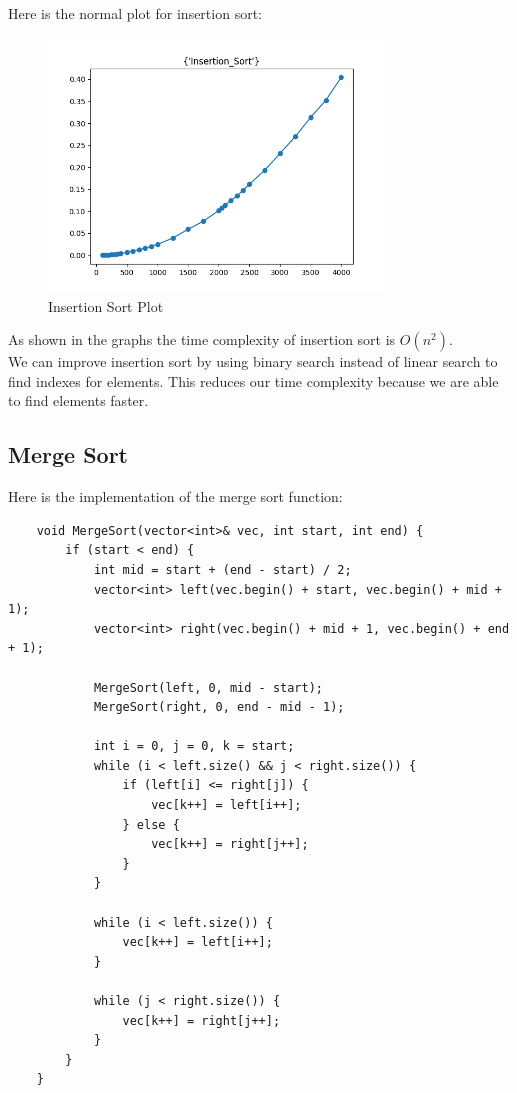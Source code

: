 \documentclass{article}
\begin{document}
Here is the normal plot for insertion sort:
\begin{figure}[H]
    \centering
    \includegraphics*[width=0.8\textwidth]{img/plot_Insertion_Sort.png}
    \caption{Insertion Sort Plot}
\end{figure}

As shown in the graphs the time complexity of insertion sort is $O(n^2)$. \\

We can improve insertion sort by using binary search instead of linear search to find indexes for elements. This reduces our time complexity because we are able to find elements faster.

\vspace{\baselineskip}
\subsection{Merge Sort}
Here is the implementation of the merge sort function:
\begin{verbatim}
    void MergeSort(vector<int>& vec, int start, int end) {
        if (start < end) {
            int mid = start + (end - start) / 2;
            vector<int> left(vec.begin() + start, vec.begin() + mid + 1);
            vector<int> right(vec.begin() + mid + 1, vec.begin() + end + 1);
            
            MergeSort(left, 0, mid - start);
            MergeSort(right, 0, end - mid - 1);
            
            int i = 0, j = 0, k = start;
            while (i < left.size() && j < right.size()) {
                if (left[i] <= right[j]) {
                    vec[k++] = left[i++];
                } else {
                    vec[k++] = right[j++];
                }
            }
            
            while (i < left.size()) {
                vec[k++] = left[i++];
            }
            
            while (j < right.size()) {
                vec[k++] = right[j++];
            }
        }
    }
\end{verbatim}
\end{document}
